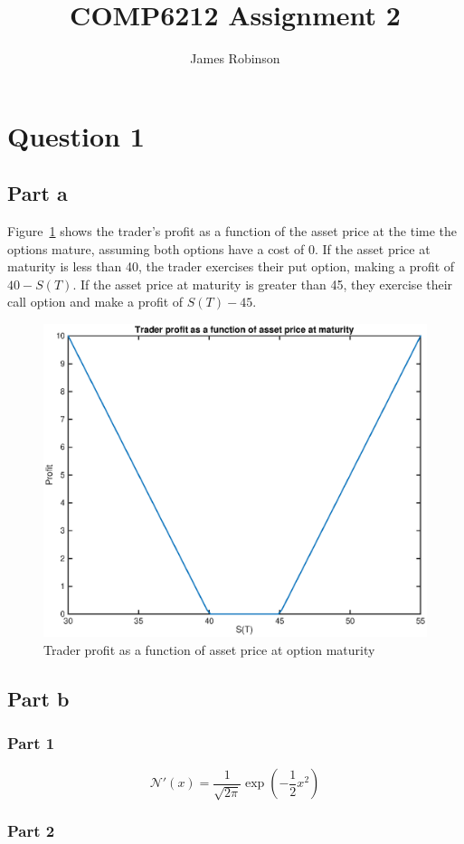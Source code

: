 \documentclass[12pt]{article}
\title{COMP6212 Assignment 2}
\author{James Robinson}
\begin{document}
	\maketitle

	\section{Question 1}

	\subsection{Part a}

	Figure~\ref{fig:p1} shows the trader's profit as a function of the asset price at the time the options mature, assuming both options have a cost of 0. If the asset price at maturity is less than 40, the trader exercises their put option, making a profit of $40 - S(T)$. If the asset price at maturity is greater than 45, they exercise their call option and make a profit of $S(T) - 45$.

	\begin{figure}[h]
		\centering
		\includegraphics[width=0.5\linewidth]{figures/p1.eps}
		\caption{Trader profit as a function of asset price at option maturity}
		\label{fig:p1}
	\end{figure}

	\subsection{Part b}

	\subsubsection{Part 1}

	$$\mathcal{N}'(x) = \frac{1}{\sqrt{2\pi}} \exp\left(-\frac{1}{2} x^2\right)$$

	\subsubsection{Part 2}
\end{document}

